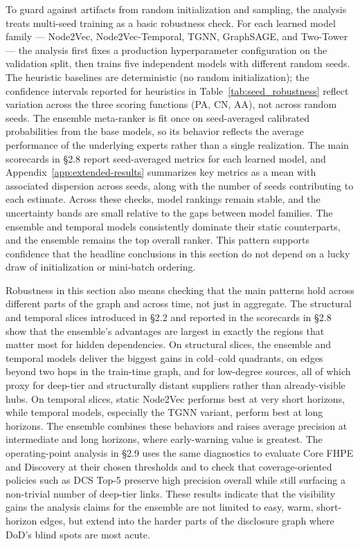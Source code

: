 To guard against artifacts from random initialization and sampling, the analysis treats multi-seed training as a basic robustness check. For each learned model family --- Node2Vec, Node2Vec-Temporal, TGNN, GraphSAGE, and Two-Tower --- the analysis first fixes a production hyperparameter configuration on the validation split, then trains five independent models with different random seeds. The heuristic baselines are deterministic (no random initialization); the confidence intervals reported for heuristics in Table~\ref{tab:seed_robustness} reflect variation across the three scoring functions (PA, CN, AA), not across random seeds. The ensemble meta-ranker is fit once on seed-averaged calibrated probabilities from the base models, so its behavior reflects the average performance of the underlying experts rather than a single realization. The main scorecards in \S2.8 report seed-averaged metrics for each learned model, and Appendix~\ref{app:extended-results} summarizes key metrics as a mean with associated dispersion across seeds, along with the number of seeds contributing to each estimate. Across these checks, model rankings remain stable, and the uncertainty bands are small relative to the gaps between model families. The ensemble and temporal models consistently dominate their static counterparts, and the ensemble remains the top overall ranker. This pattern supports confidence that the headline conclusions in this section do not depend on a lucky draw of initialization or mini-batch ordering.

Robustness in this section also means checking that the main patterns hold across different parts of the graph and across time, not just in aggregate. The structural and temporal slices introduced in \S2.2 and reported in the scorecards in \S2.8 show that the ensemble's advantages are largest in exactly the regions that matter most for hidden dependencies. On structural slices, the ensemble and temporal models deliver the biggest gains in cold--cold quadrants, on edges beyond two hops in the train-time graph, and for low-degree sources, all of which proxy for deep-tier and structurally distant suppliers rather than already-visible hubs. On temporal slices, static Node2Vec performs best at very short horizons, while temporal models, especially the TGNN variant, perform best at long horizons. The ensemble combines these behaviors and raises average precision at intermediate and long horizons, where early-warning value is greatest. The operating-point analysis in \S2.9 uses the same diagnostics to evaluate Core FHPE and Discovery at their chosen thresholds and to check that coverage-oriented policies such as DCS Top-5 preserve high precision overall while still surfacing a non-trivial number of deep-tier links. These results indicate that the visibility gains the analysis claims for the ensemble are not limited to easy, warm, short-horizon edges, but extend into the harder parts of the disclosure graph where DoD's blind spots are most acute.

